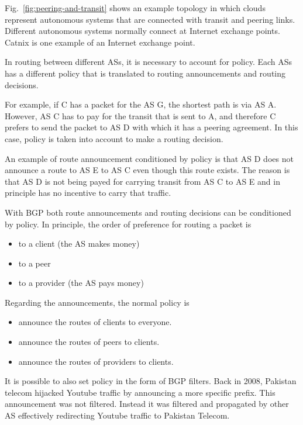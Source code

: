 Fig.~\ref{fig:peering-and-transit} shows an example topology in which clouds represent autonomous systems that are connected with transit and peering links.
Different autonomous systems normally connect at Internet exchange points. 
Catnix is one example of an Internet exchange point.

In routing between different ASs, it is necessary to account for policy.
Each ASs has a different policy that is translated to routing announcements and routing decisions. 

For example, if C has a packet for the AS G, the shortest path is via AS A.
However, AS C has to pay for the transit that is sent to A, and therefore C prefers to send the packet to AS D with which it has a peering agreement.
In this case, policy is taken into account to make a routing decision.

An example of route announcement conditioned by policy is that AS D does not announce a route to AS E to AS C even though this route exists.
The reason is that AS D is not being payed for carrying transit from AS C to AS E and in principle has no incentive to carry that traffic.

With BGP both route announcements and routing decisions can be conditioned by policy.
In principle, the order of preference for routing a packet is 
\begin{itemize}
\item to a client (the AS makes money)
\item to a peer
\item to a provider (the AS pays money)
\end{itemize}

Regarding the announcements, the normal policy is
\begin{itemize}
\item announce the routes of clients to everyone.
\item announce the routes of peers to clients.
\item announce the routes of providers to clients.
\end{itemize}

It is possible to also set policy in the form of BGP filters.
Back in 2008, Pakistan telecom hijacked Youtube traffic by announcing a more specific prefix.
This announcement was not filtered.
Instead it was filtered and propagated by other AS effectively redirecting Youtube traffic to Pakistan Telecom.

